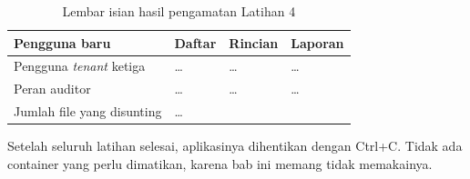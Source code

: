 \begin{table}[!htb]
  \centering
  \caption{Lembar isian hasil pengamatan Latihan 4}
  \label{tab:c10-lat4-hasil}
  \begin{tabularx}{\textwidth}{Xlll}
    \hline
    \textbf{Pengguna baru} & \textbf{Daftar} & \textbf{Rincian} & \textbf{Laporan} \\
    \hline
    Pengguna \textit{tenant} ketiga & \dots & \dots & \dots \\
    \hline
    Peran auditor & \dots & \dots & \dots \\
    \hline
    Jumlah file yang disunting & \multicolumn{3}{l}{\dots} \\
    \hline
  \end{tabularx}
\end{table}

Setelah seluruh latihan selesai, aplikasinya dihentikan dengan Ctrl+C. Tidak
ada container yang perlu dimatikan, karena bab ini memang tidak memakainya.
